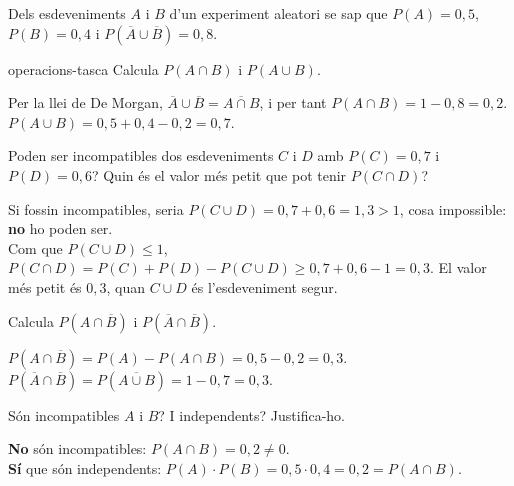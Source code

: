 Dels esdeveniments $A$ i $B$ d'un experiment aleatori se sap que $P(A)=0{,}5$, $P(B)=0{,}4$ i
$P\left(\overline{A}\cup\overline{B}\right)=0{,}8$.

\begin{apartats}

\begin{tria}{operacions-tasca}
Calcula $P(A\cap B)$ i $P(A\cup B)$.

\begin{solucio}
Per la llei de De Morgan, $\overline{A}\cup\overline{B}=\overline{A\cap B}$, i per tant
$P(A\cap B)=1-0{,}8=0{,}2$.\\
$P(A\cup B)=0{,}5+0{,}4-0{,}2=0{,}7$.
\end{solucio}

Poden ser incompatibles dos esdeveniments $C$ i $D$ amb $P(C)=0{,}7$ i $P(D)=0{,}6$? Quin és el valor més
petit que pot tenir $P(C\cap D)$?

\begin{solucio}
Si fossin incompatibles, seria $P(C\cup D)=0{,}7+0{,}6=1{,}3>1$, cosa impossible: \textbf{no} ho poden
ser.\\
Com que $P(C\cup D)\le1$, $P(C\cap D)=P(C)+P(D)-P(C\cup D)\ge0{,}7+0{,}6-1=0{,}3$. El valor més petit és
$0{,}3$, quan $C\cup D$ és l'esdeveniment segur.
\end{solucio}
\end{tria}

Calcula $P\left(A\cap\overline{B}\right)$ i $P\left(\overline{A}\cap\overline{B}\right)$.

\begin{solucio}
$P\left(A\cap\overline{B}\right)=P(A)-P(A\cap B)=0{,}5-0{,}2=0{,}3$.\\
$P\left(\overline{A}\cap\overline{B}\right)=P\left(\overline{A\cup B}\right)=1-0{,}7=0{,}3$.
\end{solucio}

\begin{nomesllarg}
Són incompatibles $A$ i $B$? I independents? Justifica-ho.

\begin{solucio}
\textbf{No} són incompatibles: $P(A\cap B)=0{,}2\neq0$.\\
\textbf{Sí} que són independents: $P(A)\cdot P(B)=0{,}5\cdot0{,}4=0{,}2=P(A\cap B)$.
\end{solucio}
\end{nomesllarg}

\end{apartats}
